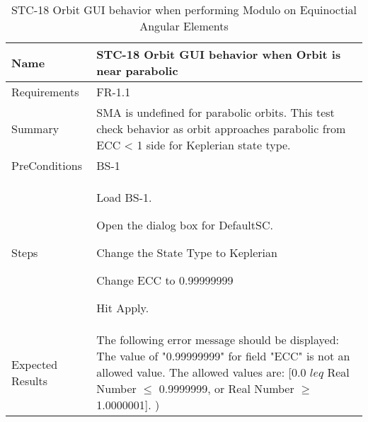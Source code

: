 \begin{table}[htbp!]
\centering
      \begin{tabular}{|p{1.05 in} |p{4.75 in} |}
      \hline
         \rowcolor[rgb]{0.8,0.8,0.8} Name & STC-18 Orbit GUI behavior when Orbit is near parabolic\\
         \hline
         Requirements & FR-1.1\\  \hline
         Summary &
         SMA is undefined for parabolic orbits.  This test check behavior as orbit approaches parabolic
         from ECC < 1 side for Keplerian state type.
         \\     \hline
         PreConditions & BS-1\\     \hline
         Steps &
         \begin{compactenum}
             \item Load BS-1.
             \item Open the dialog box for DefaultSC.
             \item Change the State Type to Keplerian
             \item Change ECC to 0.99999999
             \item Hit Apply.
         \end{compactenum}
         \\ \hline
         Expected Results & The following error message should be displayed:
         The value of "0.99999999" for field "ECC" is not an allowed value.
         The allowed values are: [0.0 $leq$ Real Number $\leq$ 0.9999999, or Real Number $\geq$ 1.0000001].
         )\\
      \hline
      \end{tabular}
      \label{Table:STC-18}
      \caption{STC-18 Orbit GUI behavior when performing Modulo on Equinoctial Angular Elements}
\end{table}
